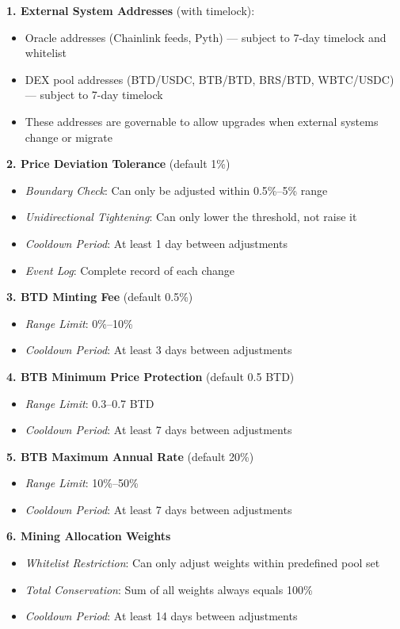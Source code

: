 \documentclass{article}
\begin{document}
\textbf{1. External System Addresses} (with timelock):
\begin{itemize}
  \item Oracle addresses (Chainlink feeds, Pyth) --- subject to 7-day timelock and whitelist
  \item DEX pool addresses (BTD/USDC, BTB/BTD, BRS/BTD, WBTC/USDC) --- subject to 7-day timelock
  \item These addresses are governable to allow upgrades when external systems change or migrate
\end{itemize}

\textbf{2. Price Deviation Tolerance} (default 1\%)
\begin{itemize}
  \item \textit{Boundary Check}: Can only be adjusted within 0.5\%--5\% range
  \item \textit{Unidirectional Tightening}: Can only lower the threshold, not raise it
  \item \textit{Cooldown Period}: At least 1 day between adjustments
  \item \textit{Event Log}: Complete record of each change
\end{itemize}

\textbf{3. BTD Minting Fee} (default 0.5\%)
\begin{itemize}
  \item \textit{Range Limit}: 0\%--10\%
  \item \textit{Cooldown Period}: At least 3 days between adjustments
\end{itemize}

\textbf{4. BTB Minimum Price Protection} (default 0.5 BTD)
\begin{itemize}
  \item \textit{Range Limit}: 0.3--0.7 BTD
  \item \textit{Cooldown Period}: At least 7 days between adjustments
\end{itemize}

\textbf{5. BTB Maximum Annual Rate} (default 20\%)
\begin{itemize}
  \item \textit{Range Limit}: 10\%--50\%
  \item \textit{Cooldown Period}: At least 7 days between adjustments
\end{itemize}

\textbf{6. Mining Allocation Weights}
\begin{itemize}
  \item \textit{Whitelist Restriction}: Can only adjust weights within predefined pool set
  \item \textit{Total Conservation}: Sum of all weights always equals 100\%
  \item \textit{Cooldown Period}: At least 14 days between adjustments
\end{itemize}
\end{document}
